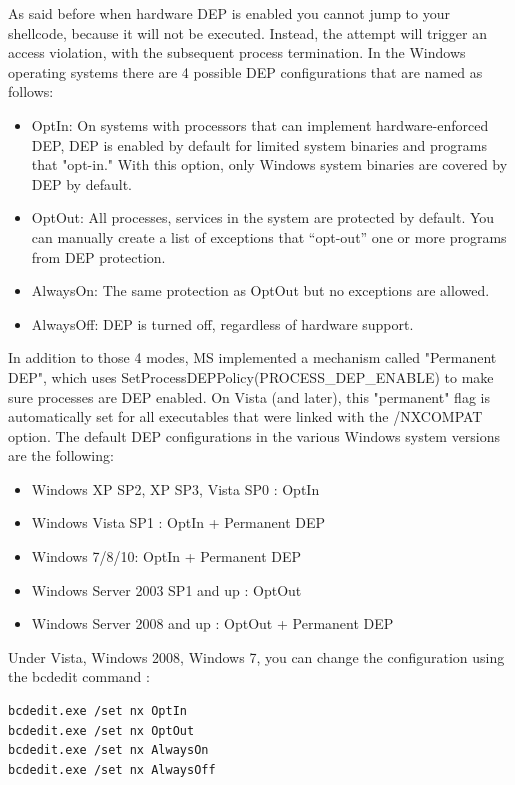\documentclass[Lau,binding=0.6cm]{sapthesis}
\begin{document}
As said before when hardware DEP is enabled you cannot jump to your shellcode, because it will not be executed. Instead, the attempt will trigger an access violation, with the subsequent process termination.
In the Windows operating systems there are 4 possible DEP configurations that are named as follows:
\begin{itemize}
\item
OptIn: On systems with processors that can implement hardware-enforced DEP, DEP is enabled by default for limited system binaries and programs that "opt-in." With this option, only Windows system binaries are covered by DEP by default. 
\item
OptOut: All processes, services in the system are protected by default. You can manually create a list of  exceptions that “opt-out” one or more programs from DEP protection.
\item
AlwaysOn: The same protection as OptOut but no exceptions are allowed.
\item
AlwaysOff: DEP is turned off, regardless of hardware support.
\end{itemize}

In addition to those 4 modes, MS implemented a mechanism called "Permanent DEP", which uses SetProcessDEPPolicy(PROCESS\_DEP\_ENABLE) to make sure processes are DEP enabled. On Vista (and later), this "permanent" flag is automatically set for all executables that were linked with the /NXCOMPAT option.
The default DEP configurations in the various Windows system versions are the following:
\begin{itemize}

\item Windows XP SP2, XP SP3, Vista SP0 : OptIn
\item Windows Vista SP1 : OptIn + Permanent DEP
\item Windows 7/8/10: OptIn + Permanent DEP
\item Windows Server 2003 SP1 and up : OptOut
\item Windows Server 2008 and up : OptOut + Permanent DEP

\end{itemize}

Under Vista, Windows 2008, Windows 7, you can change the configuration using the bcdedit command :
\begin{verbatim}
bcdedit.exe /set nx OptIn
bcdedit.exe /set nx OptOut
bcdedit.exe /set nx AlwaysOn
bcdedit.exe /set nx AlwaysOff
\end{verbatim}
\end{document}
